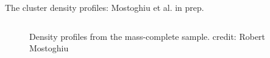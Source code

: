 \documentclass[aspectratio=43]{beamer}
\begin{document}
\begin{frame}{The cluster density profiles: Mostoghiu et al. in prep.}
\begin{columns}[t]
\begin{column}{0.7\textwidth}
{\begin{figure}
        \caption{Density profiles from the mass-complete sample. credit: Robert Mostoghiu}
      \end{figure}}
    \end{column}
  \end{columns}
\end{frame}
\end{document}
